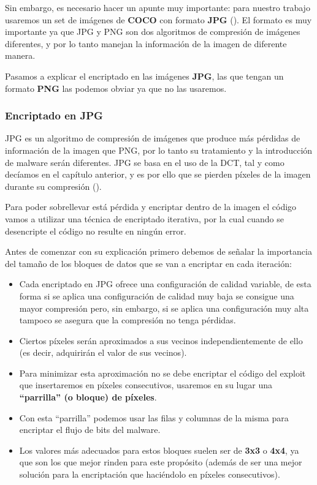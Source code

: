 Sin embargo, es necesario hacer un apunte muy importante: para nuestro trabajo usaremos un set de imágenes de \textbf{COCO} con formato \textbf{JPG} (\cite{coco}). El formato es muy importante ya que JPG y PNG son dos algoritmos de compresión de imágenes diferentes, y por lo tanto manejan la información de la imagen de diferente manera. %

Pasamos a explicar el encriptado en las imágenes \textbf{JPG}, las que tengan un formato \textbf{PNG} las podemos obviar ya que no las usaremos.

\subsubsection{Encriptado en JPG}

JPG es un algoritmo de compresión de imágenes que produce más pérdidas de información de la imagen que PNG, por lo tanto su tratamiento y la introducción de malware serán diferentes. JPG se basa en el uso de la \ac{DCT}, tal y como decíamos en el capítulo anterior, y es por ello que se pierden píxeles de la imagen durante su compresión (\cite{dct}). %

Para poder sobrellevar está pérdida y encriptar dentro de la imagen el código vamos a utilizar una técnica de encriptado iterativa, por la cual cuando se desencripte el código no resulte en ningún error.

Antes de comenzar con su explicación primero debemos de señalar la importancia del tamaño de los bloques de datos que se van a encriptar en cada iteración: 

\begin{itemize}
\item Cada encriptado en JPG ofrece una configuración de calidad variable, de esta forma si se aplica una configuración de calidad muy baja se consigue una mayor compresión pero, sin embargo, si se aplica una configuración muy alta tampoco se asegura que la compresión no tenga pérdidas.
\item Ciertos píxeles serán aproximados a sus vecinos independientemente de ello (es decir, adquirirán el valor de sus vecinos).
\item Para minimizar esta aproximación no se debe encriptar el código del exploit que insertaremos en píxeles consecutivos, usaremos en su lugar una \textbf{``parrilla'' (o bloque) de píxeles}.
\item Con esta ``parrilla'' podemos usar las filas y columnas de la misma para encriptar el flujo de bits del malware.
\item Los valores más adecuados para estos bloques suelen ser de \textbf{3x3} o \textbf{4x4}, ya que son los que mejor rinden para este propósito (además de ser una mejor solución para la encriptación que haciéndolo en píxeles consecutivos).
\end{itemize}

